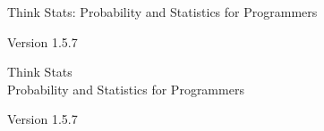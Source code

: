 \documentclass[12pt]{book}
\newcommand{\theversion}{1.5.7}
\begin{document}



\begin{latexonly}

\renewcommand{\blankpage}{\thispagestyle{empty} \quad \newpage}



\thispagestyle{empty}

\begin{flushright}
\vspace*{2.0in}

\begin{spacing}{3}
{\huge Think Stats: Probability and Statistics for Programmers}\\
{\Large }
\end{spacing}

\vspace{0.25in}

Version \theversion

\vfill

\end{flushright}


\blankpage
\blankpage

\pagebreak
\thispagestyle{empty}

\begin{flushright}
\vspace*{2.0in}

\begin{spacing}{3}
{\huge Think Stats}\\
{\Large Probability and Statistics for Programmers}
\end{spacing}

\vspace{0.25in}

Version \theversion

\vspace{1in}



\end{flushright}
\end{latexonly}
\end{document}

